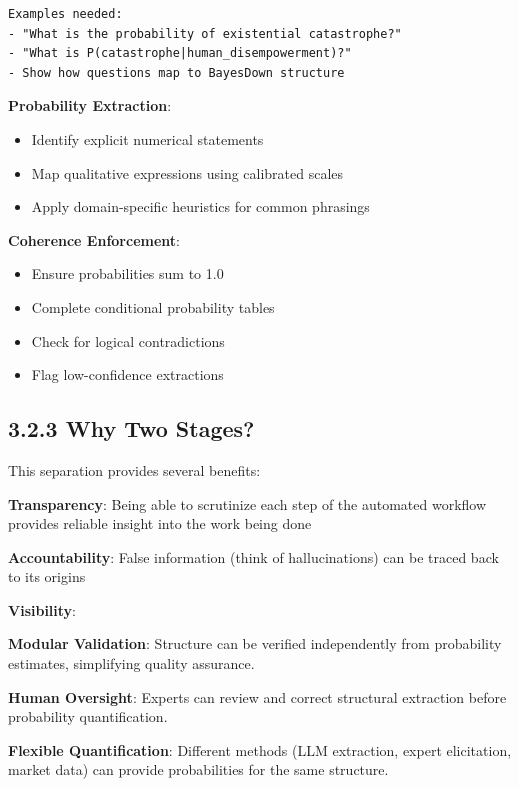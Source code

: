 \documentclass[
  11pt,
  letterpaper,
]{book}
\providecommand{\tightlist}{%
  \setlength{\itemsep}{0pt}\setlength{\parskip}{0pt}}
\begin{document}
\begin{verbatim}
Examples needed:
- "What is the probability of existential catastrophe?"
- "What is P(catastrophe|human_disempowerment)?"
- Show how questions map to BayesDown structure
\end{verbatim}

\textbf{Probability Extraction}:

\begin{itemize}
\tightlist
\item
  Identify explicit numerical statements
\item
  Map qualitative expressions using calibrated scales
\item
  Apply domain-specific heuristics for common phrasings
\end{itemize}

\textbf{Coherence Enforcement}:

\begin{itemize}
\tightlist
\item
  Ensure probabilities sum to 1.0
\item
  Complete conditional probability tables
\item
  Check for logical contradictions
\item
  Flag low-confidence extractions
\end{itemize}

\subsection*{3.2.3 Why Two Stages?}\label{sec-why-two-stages}

This separation provides several benefits:

\textbf{Transparency}: Being able to scrutinize each step of the
automated workflow provides reliable insight into the work being done

\textbf{Accountability}: False information (think of hallucinations) can
be traced back to its origins

\textbf{Visibility}:

\textbf{Modular Validation}: Structure can be verified independently
from probability estimates, simplifying quality assurance.

\textbf{Human Oversight}: Experts can review and correct structural
extraction before probability quantification.

\textbf{Flexible Quantification}: Different methods (LLM extraction,
expert elicitation, market data) can provide probabilities for the same
structure.
\end{document}
